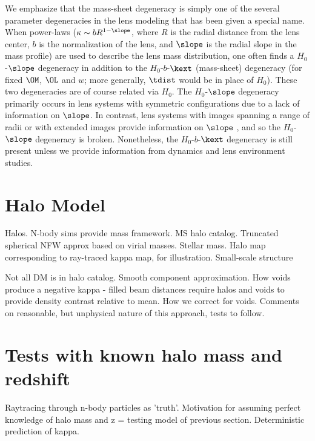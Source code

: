\documentclass[useAMS,usenatbib]{mn2e}
\begin{document}
We emphasize that the mass-sheet degeneracy is simply one of the
several parameter degeneracies in the lens modeling that has been
given a special name.  When power-laws ($\kappa \sim b R^{1-\slope}$,
where $R$ is the radial distance from the lens center, $b$ is the
normalization of the lens, and $\slope$ is the radial slope in the
mass profile) are used to describe the lens mass distribution, one
often finds a $H_0$-$\slope$ degeneracy in addition to the
$H_0$-$b$-$\kext$ (mass-sheet) degeneracy (for fixed $\OM$, $\OL$ and
$w$; more generally, $\tdist$ would be in place of $H_0$).  These two
degeneracies are of course related via $H_0$.  The $H_0$-$\slope$
degeneracy primarily occurs in lens systems with symmetric
configurations due to a lack of information on $\slope$.  In contrast,
lens systems with images spanning a range of radii or with extended
images provide information on $\slope$
\citep[e.g.][]{WucknitzEtal04,DyeEtal08}, and so the $H_0$-$\slope$
degeneracy is broken.  Nonetheless, the $H_0$-$b$-$\kext$ degeneracy
is still present unless we provide information from dynamics and lens
environment studies.  





\section{Halo Model}
\label{sec:model}

Halos. N-body sims provide mass framework. MS halo catalog. Truncated spherical
NFW approx based on virial masses. Stellar mass. Halo map corresponding to
ray-traced kappa map, for illustration. Small-scale structure 

Not all DM is in halo catalog. Smooth component approximation.  How voids
produce a negative kappa - filled beam distances require halos and voids to
provide density contrast relative to mean. How we correct for voids. Comments on
reasonable, but unphysical nature of this approach, tests to follow. 



\section{Tests with known halo mass and redshift}
\label{sec:knownMh+z} 

Raytracing through n-body particles as 'truth'. Motivation for assuming perfect
knowledge of halo mass and z = testing model of previous section. Deterministic
prediction of kappa.
\end{document}
